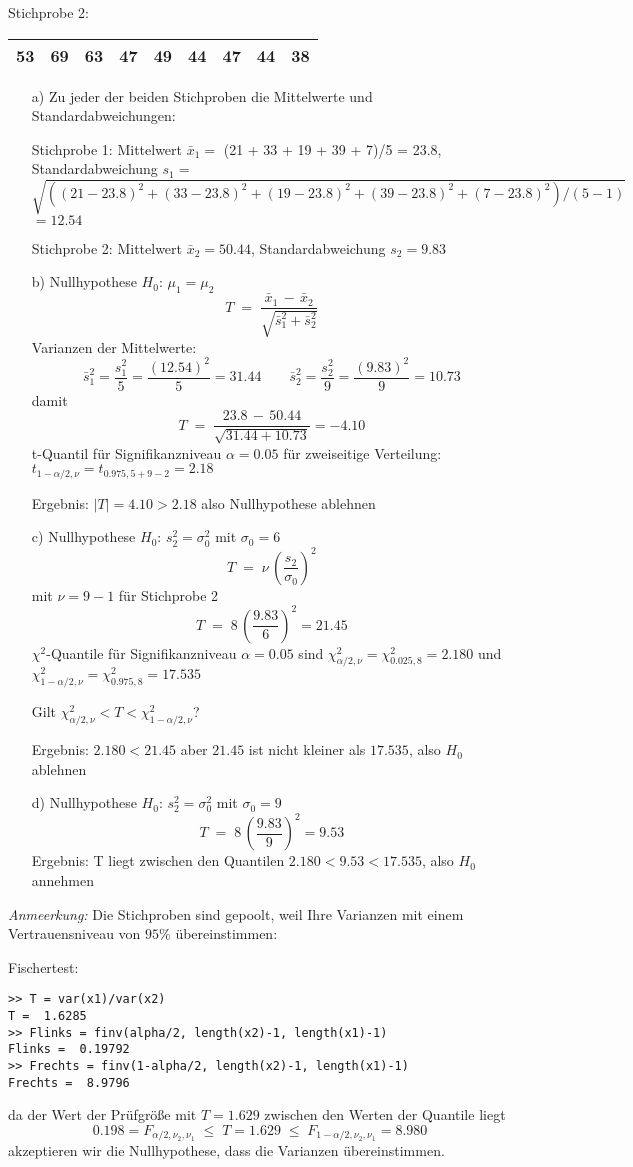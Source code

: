 Stichprobe 2:

\begin{tabular}{|c|c|c|c|c|c|c|c|c|}
\hline
53 & 69 & 63 & 47 & 49 & 44 & 47 & 44 & 38\\
\hline
\end{tabular}

\begin{itemize}
\item[a)] Zu jeder der beiden Stichproben die Mittelwerte und Standardabweichungen:

Stichprobe 1: Mittelwert $\bar x_1 = $ (21 + 33 + 19 + 39 + 7)/5 = 23.8,
Standardabweichung $s_1 = $ $\sqrt{((21-23.8)^2 + (33-23.8)^2 + (19-23.8)^2 + (39-23.8)^2 + (7-23.8)^2)/(5-1)}$ $= 12.54$

Stichprobe 2: Mittelwert $\bar x_2 = 50.44$, Standardabweichung $s_2 = 9.83$

\item[b)] Nullhypothese $H_0$: $\mu_1 = \mu_2$
$$
T \; = \; \frac{\bar x_1 \, - \, \bar x_2}{\sqrt{\bar s_1^2 + \bar s_2^2}}
$$
Varianzen der Mittelwerte:
$$
\bar s_1^2 = \frac{s_1^2}{5} = \frac{(12.54)^2}{5} = 31.44
\qquad
\bar s_2^2 = \frac{s_2^2}{9} = \frac{(9.83)^2}{9} = 10.73
$$
damit
$$
T \; = \; \frac{23.8 \, - \, 50.44}{\sqrt{31.44 + 10.73}} = -4.10
$$
t-Quantil für Signifikanzniveau $\alpha = 0.05$ für zweiseitige Verteilung:
$t_{1-\alpha/2,\nu} = t_{0.975,5+9-2} = 2.18$

Ergebnis: $|T| = 4.10 > 2.18$ also Nullhypothese ablehnen

\item[c)] Nullhypothese $H_0$: $s_2^2 = \sigma_0^2$ mit $\sigma_0 = 6$
$$
T \; = \; \nu \, \left( \frac{s_2}{\sigma_0} \right)^2
$$
mit $\nu = 9-1$ für Stichprobe 2
$$
T \; = \; 8 \, \left( \frac{9.83}{6} \right)^2 = 21.45
$$
$\chi^2$-Quantile für Signifikanzniveau $\alpha = 0.05$ sind
$\chi^2_{\alpha/2,\nu} = \chi^2_{0.025,8} = 2.180$ und
$\chi^2_{1-\alpha/2,\nu} = \chi^2_{0.975,8} = 17.535$

Gilt $\chi^2_{\alpha/2,\nu} < T < \chi^2_{1-\alpha/2,\nu}$?

Ergebnis: $2.180 < 21.45$ aber $21.45$ ist nicht kleiner als $17.535$, also $H_0$ ablehnen

\item[d)] Nullhypothese $H_0$: $s_2^2 = \sigma_0^2$ mit $\sigma_0 = 9$
$$
T \; = \; 8 \, \left( \frac{9.83}{9} \right)^2 = 9.53
$$
Ergebnis:
T liegt zwischen den Quantilen $2.180 < 9.53 < 17.535$, also $H_0$ annehmen
\end{itemize}

\textsl{Anmeerkung:} Die Stichproben sind gepoolt, weil Ihre Varianzen mit einem  Vertrauensniveau
von $95 \%$ übereinstimmen:

Fischertest:
\begin{verbatim}
>> T = var(x1)/var(x2)
T =  1.6285
>> Flinks = finv(alpha/2, length(x2)-1, length(x1)-1)
Flinks =  0.19792
>> Frechts = finv(1-alpha/2, length(x2)-1, length(x1)-1)
Frechts =  8.9796
\end{verbatim}
da der Wert der Prüfgröße mit $T = 1.629$ zwischen den Werten der Quantile liegt
$$
0.198 = F_{\alpha/2,\nu_2,\nu_1} \; \leq \; T = 1.629
\; \leq \; F_{1-\alpha/2,\nu_2,\nu_1} =  8.980
$$
akzeptieren wir die Nullhypothese, dass die Varianzen übereinstimmen.
